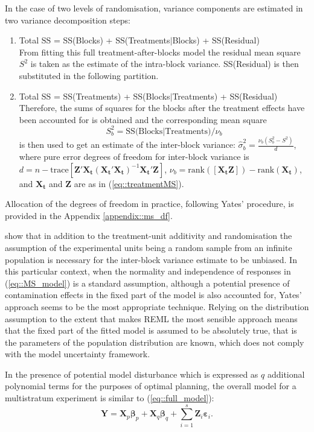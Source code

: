 In the case of two levels of randomisation, variance components are estimated in two variance decomposition steps: 
\begin{enumerate}
	\item Total SS = SS(Blocks) + SS(Treatments$\vert$Blocks) + SS(Residual)\\
	From fitting this full treatment-after-blocks model the residual mean square $S^2$ is taken as the estimate of the intra-block variance. SS(Residual) is then substituted in the following partition.
	\item Total SS = SS(Treatments) + SS(Blocks$\vert$Treatments) + SS(Residual)\\
	Therefore, the sums of squares for the blocks after the treatment effects have been accounted for is obtained and the corresponding mean square $$S^2_{b}=\mbox{SS(Blocks$\vert$Treatments)}/\nu_{b}$$ is then used to get an estimate of the inter-block variance:
	$\hat{\sigma}^2_{b}=\frac{\nu_{b}(S^2_{b}-S^2)}{d}$,
	where pure error degrees of freedom for inter-block variance is $d=n-\mbox{trace}[\bm{Z}'\bm{X_t}(\bm{X_t}'\bm{X_t})^{-1}\bm{X_t}'\bm{Z}]$, $\nu_{b}=\mbox{rank}([\bm{X_t} \bm{Z}])-\mbox{rank}(\bm{X_t})$, and $\bm{X_t}$ and $\bm{Z}$ are as in (\ref{eq::treatmentMS}).
\end{enumerate}

Allocation of the degrees of freedom in practice, following Yates' procedure, is provided in the Appendix \ref{appendix::ms_df}. 

\cite{GilmourGoos2016Robust} show that in addition to the treatment-unit additivity and randomisation the assumption of the experimental units being a random sample from an infinite population is necessary for the inter-block variance estimate to be unbiased. In this particular context, when the normality and independence of responses in (\ref{eq::MS_model}) is a standard assumption, although a potential presence of contamination effects in the fixed part of the model is also accounted for, Yates' approach seems to be the most appropriate technique. Relying on the distribution assumption to the extent that makes REML the most sensible approach means that the fixed part of the fitted model is assumed to be absolutely true, that is the parameters of the population distribution are known, which does not comply with the model uncertainty framework. 

\label{sec::ch7_search}
In the presence of potential model disturbance which is expressed as $q$ additional polynomial terms for the purposes of optimal planning, the overall model for a multistratum experiment is similar to (\ref{eq::full_model}):
\begin{equation}
\label{eq::MS_model_full}
\bm{Y}=\bm{X}_p\bm{\beta}_p+\bm{X}_q\bm{\beta}_q+\sum_{i=1}^{s}\bm{Z}_{i}\bm{\varepsilon}_{i}.
\end{equation}

